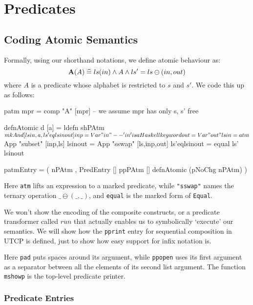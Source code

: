 \section{Predicates}\label{sec:Predicates}


\subsection{Coding Atomic Semantics}

Formally, using our shorthand notations, we define atomic behaviour as:
\[
    \mathbf{A}(A) \mathrel{\widehat=} ls(in) \land A \land ls'=ls\ominus(in,out)
\]
where $A$ is a predicate whose alphabet is restricted to $s$ and $s'$.
We code this up as follows:
\begin{code}
patm mpr = comp "A" [mpr] -- we assume mpr has only s, s' free

defnAtomic d [a] = ldefn shPAtm $ mkAnd [lsin,a,ls'eqlsinout]

inp = Var "in" -- 'in' is a Haskell keyword
out = Var "out"
lsin = atm $ App "subset" [inp,ls]
lsinout = App "sswap" [ls,inp,out]
ls'eqlsinout = equal ls' lsinout

patmEntry
 = ( nPAtm
   , PredEntry [] ppPAtm [] defnAtomic (pNoChg nPAtm) )
\end{code}
Here \texttt{atm} lifts an expression to a marked predicate,
while \texttt{"sswap"} names the ternary operation $\_\ominus(\_,\_)$,
and \texttt{equal} is the marked form of \texttt{Equal}.


We won't show the encoding of the composite constructs,
or a predicate transformer called $run$ that actually
enables us to symbolically `execute' our semantics.
We will show how the \texttt{pprint} entry for
sequential composition in UTCP is defined,
just to show how easy support for infix notation is.
Here \texttt{pad} puts spaces around its argument,
while \texttt{ppopen} uses its first argument as a
separator between all the elements of its second list argument.
The function \texttt{mshowp} is the top-level predicate printer.

\subsubsection{Predicate Entries}~

